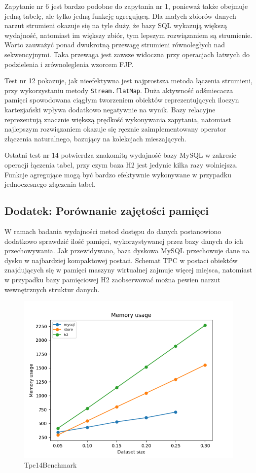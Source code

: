 \documentclass[12pt]{extarticle}
\begin{document}
    Zapytanie nr 6 jest bardzo podobne do zapytania nr 1, ponieważ także obejmuje jedną tabelę, ale tylko jedną funkcję agregującą. Dla małych zbiorów danych narzut strumieni okazuje się na tyle duży, że bazy SQL wykazują większą wydajność, natomiast im większy zbiór, tym lepszym rozwiązaniem są strumienie. Warto zauważyć ponad dwukrotną przewagę strumieni równoległych nad sekwencyjnymi. Taka przewaga jest zawsze widoczna przy operacjach łatwych do podzielenia i zrównoleglenia wzorcem FJP.

    Test nr 12 pokazuje, jak nieefektywna jest najprostsza metoda łączenia strumieni, przy wykorzystaniu metody \texttt{Stream.flatMap}. Duża aktywność odśmiecacza pamięci spowodowana ciągłym tworzeniem obiektów reprezentujących iloczyn kartezjański wpływa dodatkowo negatywnie na wynik. Bazy relacyjne reprezentują znacznie większą prędkość wykonywania zapytania, natomiast najlepszym rozwiązaniem okazuje się ręcznie zaimplementowany operator złączenia naturalnego, bazujący na kolekcjach mieszających.

    Ostatni test nr 14 potwierdza znakomitą wydajność bazy MySQL w zakresie operacji łączenia tabel, przy czym baza H2 jest jedynie kilka razy wolniejsza. Funkcje agregujące mogą być bardzo efektywnie wykonywane w przypadku jednoczesnego złączenia tabel.


\subsection{Dodatek: Porównanie zajętości pamięci}

    W ramach badania wydajności metod dostępu do danych postanowiono dodatkowo sprawdzić ilość pamięci, wykorzystywanej przez bazy danych do ich przechowywania. Jak przewidywano, baza dyskowa MySQL przechowuje dane na dysku w najbardziej kompaktowej postaci. Schemat TPC w postaci obiektów znajdujących się w pamięci maszyny wirtualnej zajmuje więcej miejsca, natomiast w przypadku bazy pamięciowej H2 zaobserwować można pewien narzut wewnętrznych struktur danych.

\begin{figure}[H]
\centering
\includegraphics[width=13cm]{plots/memory}
\caption{Tpc14Benchmark}
\end{figure}
    
\end{document}
